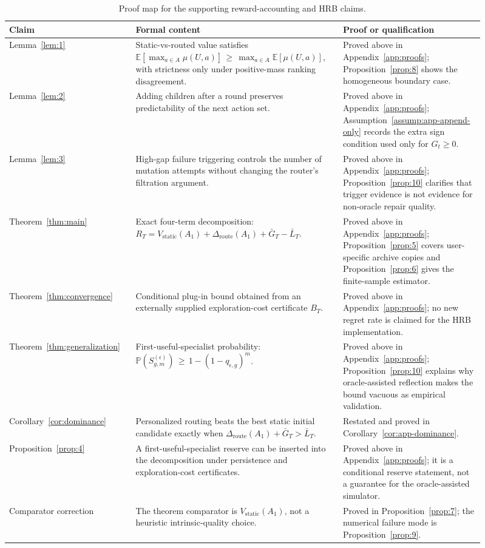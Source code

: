 \documentclass{article} %
\begin{document}
\begin{table}[h]
\centering
\small
\caption{Proof map for the supporting reward-accounting and HRB claims.}
\label{tab:app-claim-map}
\begin{tabular}{p{0.24\linewidth}p{0.39\linewidth}p{0.28\linewidth}}
\toprule
Claim & Formal content & Proof or qualification \\
\midrule
Lemma~\ref{lem:1} &
Static-vs-routed value satisfies
\(\mathbb{E}[\max_{a\in A}\mu(U,a)]\,\ge\, \max_{a\in A}\mathbb{E}[\mu(U,a)]\), with strictness only under positive-mass ranking disagreement. &
Proved above in Appendix~\ref{app:proofs}; Proposition~\ref{prop:8} shows the homogeneous boundary case. \\
\midrule
Lemma~\ref{lem:2} &
Adding children after a round preserves predictability of the next action set. &
Proved above in Appendix~\ref{app:proofs}; Assumption~\ref{assump:app-append-only} records the extra sign condition used only for \(G_t\ge 0\). \\
\midrule
Lemma~\ref{lem:3} &
High-gap failure triggering controls the number of mutation attempts without changing the router's filtration argument. &
Proved above in Appendix~\ref{app:proofs}; Proposition~\ref{prop:10} clarifies that trigger evidence is not evidence for non-oracle repair quality. \\
\midrule
Theorem~\ref{thm:main} &
Exact four-term decomposition:
\(R_T=V_{\mathrm{static}}(A_1)+\Delta_{\mathrm{route}}(A_1)+\bar G_T-\bar L_T\). &
Proved above in Appendix~\ref{app:proofs}; Proposition~\ref{prop:5} covers user-specific archive copies and Proposition~\ref{prop:6} gives the finite-sample estimator. \\
\midrule
Theorem~\ref{thm:convergence} &
Conditional plug-in bound obtained from an externally supplied exploration-cost certificate \(B_T\). &
Proved above in Appendix~\ref{app:proofs}; no new regret rate is claimed for the HRB implementation. \\
\midrule
Theorem~\ref{thm:generalization} &
First-useful-specialist probability:
\(\mathbb{P}(S_{g,m}^{(\epsilon)})\,\ge\, 1-(1-q_{\epsilon,g})^m\). &
Proved above in Appendix~\ref{app:proofs}; Proposition~\ref{prop:10} explains why oracle-assisted reflection makes the bound vacuous as empirical validation. \\
\midrule
Corollary~\ref{cor:dominance} &
Personalized routing beats the best static initial candidate exactly when
\(\Delta_{\mathrm{route}}(A_1)+\bar G_T>\bar L_T\). &
Restated and proved in Corollary~\ref{cor:app-dominance}. \\
\midrule
Proposition~\ref{prop:4} &
A first-useful-specialist reserve can be inserted into the decomposition under persistence and exploration-cost certificates. &
Proved above in Appendix~\ref{app:proofs}; it is a conditional reserve statement, not a guarantee for the oracle-assisted simulator. \\
\midrule
Comparator correction &
The theorem comparator is \(V_{\mathrm{static}}(A_1)\), not a heuristic intrinsic-quality choice. &
Proved in Proposition~\ref{prop:7}; the numerical failure mode is Proposition~\ref{prop:9}. \\
\bottomrule
\end{tabular}


\end{table}
\end{document}
